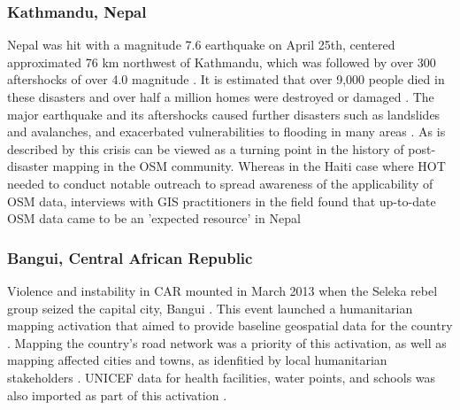 \subsubsection{Kathmandu, Nepal}

Nepal was hit with a magnitude 7.6 earthquake on April 25th, centered approximated 76 km northwest of Kathmandu, which was followed by over 300 aftershocks of over 4.0 magnitude \parencite{noauthor_nepal_2015}. It is estimated that over 9,000 people died in these disasters and over half a million homes were destroyed or damaged \parencite{noauthor_nepal_2015}. The major earthquake and its aftershocks caused further disasters such as landslides and avalanches, and exacerbated vulnerabilities to flooding in many areas \parencite{noauthor_nepal_2015}. As is described by \textcite{soden_infrastructure_2016} this crisis can be viewed as a turning point in the history of post-disaster mapping in the OSM community. Whereas in the Haiti case where HOT needed to conduct notable outreach to spread awareness of the applicability of OSM data, interviews with GIS practitioners in the field found that up-to-date OSM data came to be an 'expected resource' in Nepal \parencite[p. 2801]{soden_infrastructure_2016}


\subsubsection{Bangui, Central African Republic}

Violence and instability in CAR mounted in March 2013 when the Seleka rebel group seized the capital city, Bangui \parencite{noauthor_violence_2020}. This event launched a humanitarian mapping activation that aimed to provide baseline geospatial data for the country \parencite{noauthor_wikiproject_2020-1}. Mapping the country's road network was a priority of this activation, as well as mapping affected cities and towns, as idenfitied by local humanitarian stakeholders \parencite{noauthor_wikiproject_2020-1}. UNICEF data for health facilities, water points, and schools was also imported as part of this activation \parencite{noauthor_wikiproject_2020-1}.

